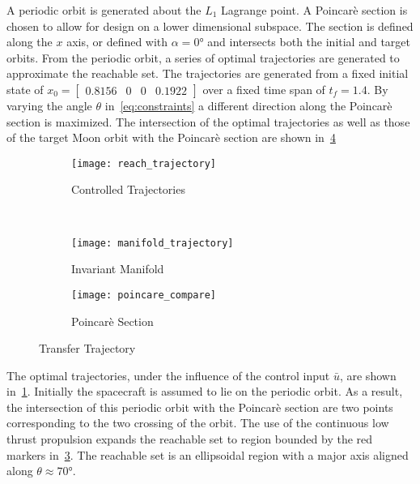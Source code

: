 \documentclass[letterpaper, preprint, paper,11pt]{AAS}	%
\begin{document}
A periodic orbit is generated about the \( L_1 \) Lagrange point. 
A Poincar\`e section is chosen to allow for design on a lower dimensional subspace.
The section is defined along the \( x \) axis, or defined with \( \alpha = \ang{0} \) and intersects both the initial and target orbits.
From the periodic orbit, a series of optimal trajectories are generated to approximate the reachable set.
The trajectories are generated from a fixed initial state of \( x_0 = \begin{bmatrix}0.8156 & 0 & 0 & 0.1922 \end{bmatrix} \) over a fixed time span of \( t_f = 1.4 \).
By varying the angle \( \theta\) in~\cref{eq:constraints} a different direction along the Poincar\`e section is maximized. 
The intersection of the optimal trajectories as well as those of the target Moon orbit with the Poincar\`e section are shown in~\cref{fig:transfer_orbit}
\begin{figure} 
	\centering 
	\begin{subfigure}[htbp]{0.5\textwidth} 
		\texttt{[image: reach\_trajectory]} 
		\caption{Controlled Trajectories} \label{fig:reach_trajectory} 
	\end{subfigure}~ %
	\begin{subfigure}[htbp]{0.5\textwidth} 
		\texttt{[image: manifold\_trajectory]} 
		\caption{Invariant Manifold} \label{fig:manifold_trajectory} 
	\end{subfigure} 
	
	\begin{subfigure}[htbp]{0.5\textwidth} 
		\texttt{[image: poincare\_compare]} 
		\caption{Poincar\`e Section} \label{fig:poincare_compare} 
	\end{subfigure} 
	\caption{Transfer Trajectory}
	\label{fig:transfer_orbit} 
\end{figure}
The optimal trajectories, under the influence of the control input \( \bar{u} \), are shown in~\cref{fig:reach_trajectory}.
Initially the spacecraft is assumed to lie on the periodic orbit.
As a result, the intersection of this periodic orbit with the Poincar\`e section are two points corresponding to the two crossing of the orbit.
The use of the continuous low thrust propulsion expands the reachable set to region bounded by the red markers in~\cref{fig:poincare_compare}.
The reachable set is an ellipsoidal region with a major axis aligned along \( \theta \approx \ang{70} \).
\end{document}
